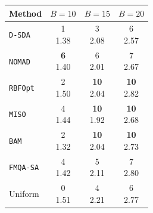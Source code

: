 \begin{tabular}{@{}lccc@{}}\toprule
Method & \(B=10\) & \(B=15\) & \(B=20\)\\\midrule
\texttt{D-SDA} & \makecell{1\\1.38} & \makecell{3\\2.08} & \makecell{6\\2.57} \\
\texttt{NOMAD} & \makecell{\textbf{6}\\1.40} & \makecell{6\\2.01} & \makecell{7\\2.67} \\
\texttt{RBFOpt} & \makecell{2\\1.50} & \makecell{\textbf{10}\\2.04} & \makecell{\textbf{10}\\2.82} \\
\texttt{MISO} & \makecell{4\\1.44} & \makecell{\textbf{10}\\1.92} & \makecell{\textbf{10}\\2.68} \\
\texttt{BAM} & \makecell{2\\1.32} & \makecell{\textbf{10}\\2.04} & \makecell{\textbf{10}\\2.73} \\
\texttt{FMQA-SA} & \makecell{4\\1.42} & \makecell{5\\2.11} & \makecell{7\\2.80} \\
Uniform & \makecell{0\\1.51} & \makecell{4\\2.21} & \makecell{6\\2.77} \\
\bottomrule\end{tabular}
